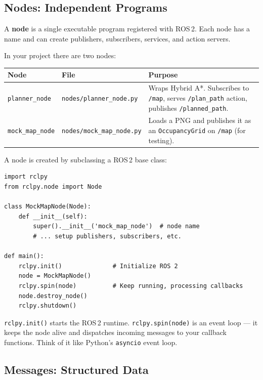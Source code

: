 \documentclass[12pt, a4paper]{article}
\begin{document}
\subsection{Nodes: Independent Programs}
\label{sec:nodes}

A \textbf{node} is a single executable program registered with ROS\,2.
Each node has a name and can create publishers, subscribers, services,
and action servers.

In your project there are two nodes:

\begin{center}
\begin{tabular}{llp{7cm}}
    \toprule
    \textbf{Node} & \textbf{File} & \textbf{Purpose} \\
    \midrule
    \texttt{planner\_node} & \texttt{nodes/planner\_node.py} & Wraps Hybrid A*. Subscribes to \texttt{/map}, serves \texttt{/plan\_path} action, publishes \texttt{/planned\_path}. \\
    \texttt{mock\_map\_node} & \texttt{nodes/mock\_map\_node.py} & Loads a PNG and publishes it as an \texttt{OccupancyGrid} on \texttt{/map} (for testing). \\
    \bottomrule
\end{tabular}
\end{center}

A node is created by subclassing a ROS\,2 base class:

\begin{lstlisting}[style=python, caption={Creating a basic node (mock\_map\_node.py)}]
import rclpy
from rclpy.node import Node

class MockMapNode(Node):
    def __init__(self):
        super().__init__('mock_map_node')  # node name
        # ... setup publishers, subscribers, etc.

def main():
    rclpy.init()              # Initialize ROS 2
    node = MockMapNode()
    rclpy.spin(node)          # Keep running, processing callbacks
    node.destroy_node()
    rclpy.shutdown()
\end{lstlisting}

\texttt{rclpy.init()} starts the ROS\,2 runtime. \texttt{rclpy.spin(node)} is
an event loop --- it keeps the node alive and dispatches incoming messages
to your callback functions. Think of it like Python's \texttt{asyncio} event loop.

\subsection{Messages: Structured Data}
\label{sec:messages}
\end{document}
